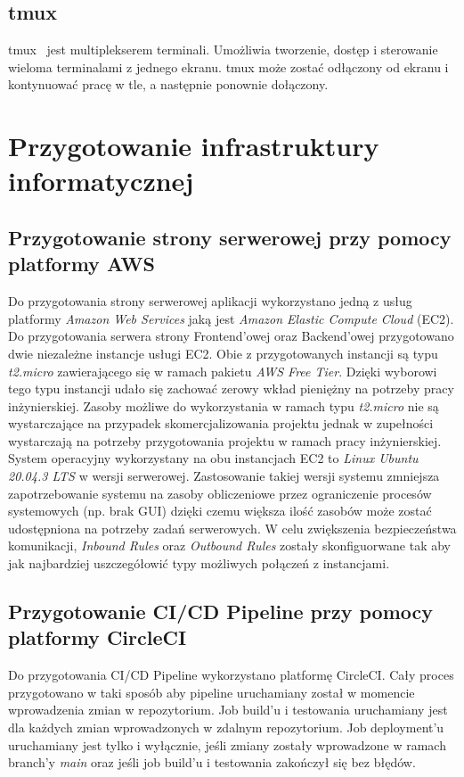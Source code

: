 	\subsection{tmux}
	tmux~\cite{tmux} jest multiplekserem terminali. Umożliwia tworzenie, dostęp i sterowanie wieloma terminalami z jednego ekranu. tmux może zostać odłączony od ekranu i kontynuować pracę w tle, a następnie ponownie dołączony.

\section{Przygotowanie infrastruktury informatycznej}
	\subsection{Przygotowanie strony serwerowej przy pomocy platformy AWS}
	Do przygotowania strony serwerowej aplikacji wykorzystano jedną z usług platformy \textit{Amazon Web Services} jaką jest \textit{Amazon Elastic Compute Cloud} (EC2). Do przygotowania serwera strony Frontend'owej oraz Backend'owej przygotowano dwie niezależne instancje usługi EC2. Obie z przygotowanych instancji są typu \textit{t2.micro} zawierającego się w ramach pakietu \textit{AWS Free Tier}. Dzięki wyborowi tego typu instancji udało się zachować zerowy wkład pieniężny na potrzeby pracy inżynierskiej. Zasoby możliwe do wykorzystania w ramach typu \textit{t2.micro} nie są wystarczające na przypadek skomercjalizowania projektu jednak w zupełności wystarczają na potrzeby przygotowania projektu w ramach pracy inżynierskiej.
System operacyjny wykorzystany na obu instancjach EC2 to \textit{Linux Ubuntu 20.04.3 LTS} w wersji serwerowej. Zastosowanie takiej wersji systemu zmniejsza zapotrzebowanie systemu na zasoby obliczeniowe przez ograniczenie procesów systemowych (np. brak GUI) dzięki czemu większa ilość zasobów może zostać udostępniona na potrzeby zadań serwerowych. W celu zwiększenia bezpieczeństwa komunikacji, \textit{Inbound Rules} oraz \textit{Outbound Rules} zostały skonfiguorwane tak aby jak najbardziej uszczegółowić typy możliwych połączeń z instancjami.
	
	\subsection{Przygotowanie CI/CD Pipeline przy pomocy platformy CircleCI}
	Do przygotowania CI/CD Pipeline wykorzystano platformę CircleCI. Cały proces przygotowano w taki sposób aby pipeline uruchamiany został w momencie wprowadzenia zmian w repozytorium. Job build'u i testowania uruchamiany jest dla każdych zmian wprowadzonych w zdalnym repozytorium. Job deployment'u uruchamiany jest tylko i wyłącznie, jeśli zmiany zostały wprowadzone w ramach branch'y \textit{main} oraz jeśli job build'u i testowania zakończył się bez błędów.
	
